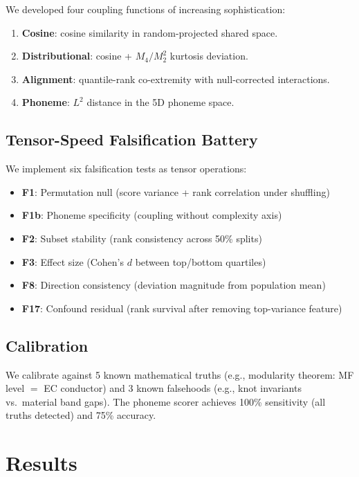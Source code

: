 \documentclass[11pt,a4paper]{article}
\begin{document}
We developed four coupling functions of increasing sophistication:
\begin{enumerate}[nosep]
    \item \textbf{Cosine}: cosine similarity in random-projected shared space.
    \item \textbf{Distributional}: cosine + $M_4/M_2^2$ kurtosis deviation.
    \item \textbf{Alignment}: quantile-rank co-extremity with null-corrected interactions.
    \item \textbf{Phoneme}: $L^2$ distance in the 5D phoneme space.
\end{enumerate}

\subsection{Tensor-Speed Falsification Battery}

We implement six falsification tests as tensor operations:
\begin{itemize}[nosep]
    \item \textbf{F1}: Permutation null (score variance + rank correlation under shuffling)
    \item \textbf{F1b}: Phoneme specificity (coupling without complexity axis)
    \item \textbf{F2}: Subset stability (rank consistency across 50\% splits)
    \item \textbf{F3}: Effect size (Cohen's $d$ between top/bottom quartiles)
    \item \textbf{F8}: Direction consistency (deviation magnitude from population mean)
    \item \textbf{F17}: Confound residual (rank survival after removing top-variance feature)
\end{itemize}

\subsection{Calibration}

We calibrate against 5 known mathematical truths (e.g., modularity theorem: MF level $=$ EC conductor) and 3 known falsehoods (e.g., knot invariants vs.\ material band gaps). The phoneme scorer achieves 100\% sensitivity (all truths detected) and 75\% accuracy.

\section{Results}
\end{document}
